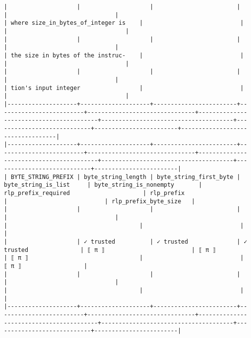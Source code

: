 \documentclass[varwidth=\maxdimen,margin=0.5cm,multi={verbatim}]{standalone}
\begin{document}
\begin{verbatim}
|                    |                    |                        |                         |                               |                                         | where size_in_bytes_of_integer is    |                            |                        |                                  |
|                    |                    |                        |                         |                               |                                         | the size in bytes of the instruc-    |                            |                        |                                  |
|                    |                    |                        |                         |                               |                                         | tion's input integer                 |                            |                        |                                  |
|--------------------+--------------------+------------------------+-------------------------+-------------------------------+-----------------------------------------+--------------------------------------+----------------------------+------------------------+----------------------------------|
|--------------------+--------------------+------------------------+-------------------------+-------------------------------+-----------------------------------------+--------------------------------------+----------------------------+------------------------|
| BYTE_STRING_PREFIX | byte_string_length | byte_string_first_byte | byte_string_is_list     | byte_string_is_nonempty       | rlp_prefix_required                     | rlp_prefix                           |                            | rlp_prefix_byte_size   |
|                    |                    |                        |                         |                               |                                         |                                      |                            |                        |
|                    | ✓ trusted          | ✓ trusted              | ✓ trusted               | ⟦ π ⟧                         | ⟦ π ⟧                                   | ⟦ π ⟧                                |                            | ⟦ π ⟧                  |
|                    |                    |                        |                         |                               |                                         |                                      |                            |                        |
|--------------------+--------------------+------------------------+-------------------------+-------------------------------+-----------------------------------------+--------------------------------------+----------------------------+------------------------|

\end{verbatim}
\end{document}
